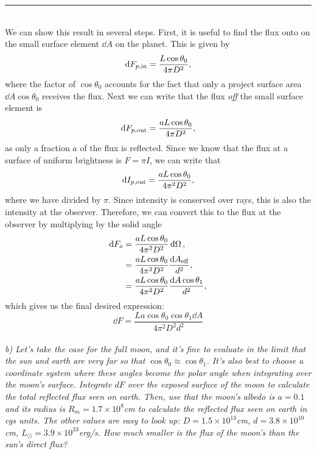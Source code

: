 \documentclass[12pt, letterpaper, twoside]{article}
\newcommand{\answer}[1]{
    \par\noindent\rule{\textwidth}{0.4pt}\\#1\\
}
\begin{document}
\answer{
    We can show this result in several steps. First, it is useful to find the flux onto on the small surface element $\dd{A}$ on the planet. This is given by
    \begin{equation}
        \dd{F_{p, {\rm in}}} = \frac{L \cos \theta_0}{4 \pi D^2},
    \end{equation}
    where the factor of $\cos \theta_0$ accounts for the fact that only a project surface area $\dd{A} \cos \theta_0$ receives the flux. Next we can write that the flux \textit{off} the small surface element is
    \begin{equation}
        \dd{F_{p, {\rm out}}} = \frac{a L \cos \theta_0}{4 \pi D^2},
    \end{equation}
    as only a fraction $a$ of the flux is reflected. Since we know that the flux at a surface of uniform brightness is $F = \pi I$, we can write that
    \begin{equation}
        \dd{I_{p, {\rm out}}} = \frac{a L \cos \theta_0}{4 \pi^2 D^2},
    \end{equation}
    where we have divided by $\pi$. Since intensity is conserved over rays, this is also the intensity at the observer. Therefore, we can convert this to the flux at the observer by multiplying by the solid angle
    \begin{align}
        \dd{F_{o}} &= \frac{a L \cos \theta_0}{4 \pi^2 D^2} \dd{\Omega},\\
        &= \frac{a L \cos \theta_0}{4 \pi^2 D^2} \frac{\dd{A_{\rm eff}}}{d^2},\\
        &= \frac{a L \cos \theta_0}{4 \pi^2 D^2} \frac{\dd{A} \cos \theta_1}{d^2},
    \end{align}
    which gives us the final desired expression:
    \begin{equation}
        \boxed{ \dd{F} = \frac{L a \cos \theta_0 \cos \theta_1 \dd{A}}{4 \pi^2 D^2 d^2} }
    \end{equation}
}

{\it b) Let's take the case for the full moon, and it's fine to evaluate in the limit that the sun and earth are very far so that $\cos \theta_0  \approx \cos \theta_1$.  It's also best to choose a coordinate system where these angles become the polar angle when integrating over the moon's surface. Integrate $dF$ over the exposed surface of the moon to calculate the total reflected flux seen on earth.  Then, use that the moon's albedo is $a=0.1$ and its radius is $R_m = 1.7\times10^8$cm to calculate the reflected flux seen on earth in cgs units.  The other values are easy to look up: $D=1.5\times10^{13}$cm,  $d=3.8\times10^{10}$cm, $L_\odot = 3.9\times10^{33}$erg/s.  How much smaller is the flux of the moon's than the sun's direct flux?   }
\end{document}
